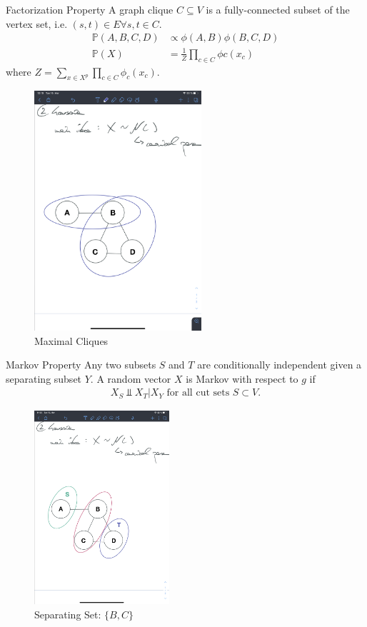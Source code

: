 \documentclass{beamer}
\begin{document}
\begin{frame}{Factorization Property}
A graph clique $C \subseteq V$ is a fully-connected subset of the vertex set, i.e. $(s,t) \in E \forall s,t \in C$. \cite{hastie2015statistical}
\begin{align*}
	\mathbb{P}(A, B, C, D) &\propto \phi(A,B) \phi(B, C, D) \\
	\mathbb{P}(X) &= \frac{1}{Z} \prod_{c \in C} \phi c (x_c)
\end{align*}
where $Z=\sum_{x \in X^{p}} \prod_{c \in C} \phi_{c}\left(x_{c}\right)$.
\begin{figure}
	\caption{Maximal Cliques}
	\includegraphics[trim={2cm 18cm 10cm 36cm}, clip, width = 6.2cm]{graphs/IMG_0093}
\end{figure}
\end{frame}

\begin{frame}{Markov Property}
Any two subsets $S$ and $T$ are conditionally independent given a separating subset $Y$. A random vector $X$ is Markov with respect to $g$ if
\begin{align*}
	X_S \Perp X_T | X_Y \text{ for all cut sets } S \subset V.
\end{align*}
\begin{figure}
	\caption{Separating Set: $\{ B, C\}$}
	\includegraphics[trim={2cm 8cm 8cm 16cm}, clip, width = 5cm]{graphs/IMG_0094}
\end{figure}
\end{frame}
\end{document}
